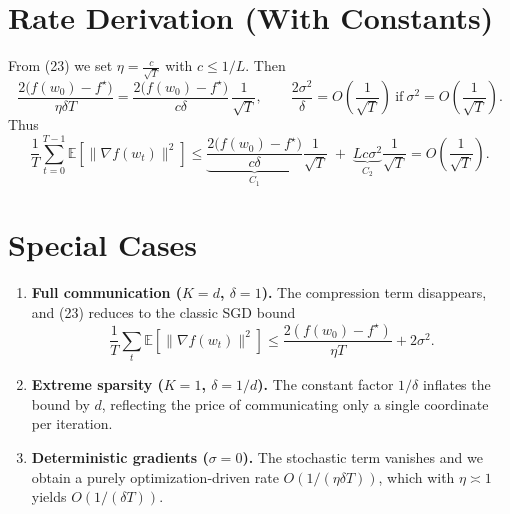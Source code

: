 \documentclass{article}
\newcommand{\E}{\mathbb{E}}
\begin{document}
\section*{Rate Derivation (With Constants)}
From (23) we set $\eta = \frac{c}{\sqrt{T}}$ with $c\le 1/L$.
Then
\[
\frac{2\bigl(f(w_{0})-f^{\star}\bigr)}{\eta\delta T}
= \frac{2\bigl(f(w_{0})-f^{\star}\bigr)}{c\delta}\,\frac{1}{\sqrt{T}},
\qquad
\frac{2\sigma^{2}}{\delta}=O\!\left(\frac{1}{\sqrt{T}}\right)
\ \text{if}\ \sigma^{2}=O\!\left(\frac{1}{\sqrt{T}}\right).
\]
Thus
\[
\frac{1}{T}\sum_{t=0}^{T-1}\E[\|\nabla f(w_{t})\|^{2}]
\le
\underbrace{\frac{2\bigl(f(w_{0})-f^{\star}\bigr)}{c\delta}}_{\displaystyle C_{1}}\frac{1}{\sqrt{T}}
\;+\;
\underbrace{L c\sigma^{2}}_{\displaystyle C_{2}}\frac{1}{\sqrt{T}}
= O\!\left(\frac{1}{\sqrt{T}}\right).
\]

\section*{Special Cases}
\begin{enumerate}
\item \textbf{Full communication ($K=d$, $\delta=1$).} The compression term disappears, and (23) reduces to the classic SGD bound 
\[
\frac{1}{T}\sum_{t}\E[\|\nabla f(w_{t})\|^{2}]
\le \frac{2(f(w_{0})-f^{\star})}{\eta T}+2\sigma^{2}.
\]
\item \textbf{Extreme sparsity ($K=1$, $\delta=1/d$).} The constant factor $1/\delta$ inflates the bound by $d$, reflecting the price of communicating only a single coordinate per iteration.
\item \textbf{Deterministic gradients ($\sigma=0$).} The stochastic term vanishes and we obtain a purely optimization‑driven rate $O(1/(\eta\delta T))$, which with $\eta\asymp1$ yields $O(1/( \delta T))$.
\end{enumerate}
\end{document}
